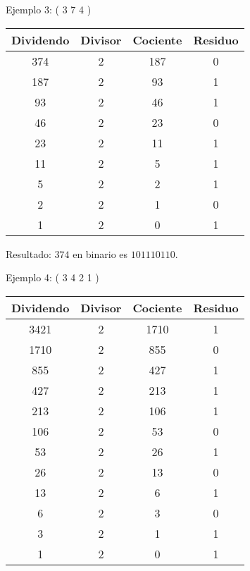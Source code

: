 \documentclass{IEEEcsmag}
\begin{document}
Ejemplo 3: ( 3 7 4 )  \newline
\newline \begin{tabular}{|c|c|c|c|}
  \hline
  Dividendo & Divisor & Cociente & Residuo \\
  \hline
  374 & 2 & 187 & 0 \\
  187 & 2 & 93 & 1 \\
  93 & 2 & 46 & 1 \\
  46 & 2 & 23 & 0 \\
  23 & 2 & 11 & 1 \\
  11 & 2 & 5 & 1 \\
  5 & 2 & 2 & 1 \\
  2 & 2 & 1 & 0 \\
  1 & 2 & 0 & 1 \\
  \hline
\end{tabular}
\newline

Resultado: \(374\) en binario es \(101110110\).
\newline


Ejemplo 4: ( 3 4 2 1 ) \newline 
\newline \begin{tabular}{|c|c|c|c|}
  \hline
  Dividendo & Divisor & Cociente & Residuo \\
  \hline
  3421 & 2 & 1710 & 1 \\
  1710 & 2 & 855 & 0 \\
  855 & 2 & 427 & 1 \\
  427 & 2 & 213 & 1 \\
  213 & 2 & 106 & 1 \\
  106 & 2 & 53 & 0 \\
  53 & 2 & 26 & 1 \\
  26 & 2 & 13 & 0 \\
  13 & 2 & 6 & 1 \\
  6 & 2 & 3 & 0 \\
  3 & 2 & 1 & 1 \\
  1 & 2 & 0 & 1 \\
  \hline
\end{tabular}
\newline
\end{document}
